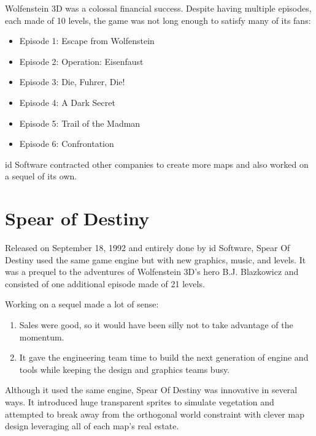 \documentclass[book.tex]{subfiles}
\begin{document}
Wolfenstein 3D was a colossal financial success. Despite having multiple episodes, each made of 10 levels, the game was not long enough to satisfy many of its fans:\\
\par
\begin{itemize}
\item Episode 1: Escape from Wolfenstein
\item Episode 2: Operation: Eisenfaust
\item Episode 3: Die, Fuhrer, Die!
\item Episode 4: A Dark Secret
\item Episode 5: Trail of the Madman
\item Episode 6: Confrontation
\end{itemize}
id Software contracted other companies to create more maps and also worked on a sequel of its own.

\section{Spear of Destiny}
Released on September 18, 1992 and entirely done by id Software, Spear Of Destiny used the same game engine but with new graphics, music, and levels. It was a prequel to the adventures of Wolfenstein 3D's hero B.J. Blazkowicz and consisted of one additional episode made of 21 levels.\\
   \par
\begin{figure}[H]
\centering
 \end{figure}
 \par
 Working on a sequel made a lot of sense:
 \begin{enumerate}
 \item Sales were good, so it would have been silly not to take advantage of the momentum.
 \item It gave the engineering team time to build the next generation of engine and tools while keeping the design and graphics teams busy.
 \end{enumerate}
Although it used the same engine, Spear Of Destiny was innovative in several ways. It introduced huge transparent sprites to simulate vegetation and attempted to break away from the orthogonal world constraint with clever map design leveraging all of each map's real estate.
    \par
\begin{figure}[H]
\centering
 \end{figure}
 \par
\end{document}
